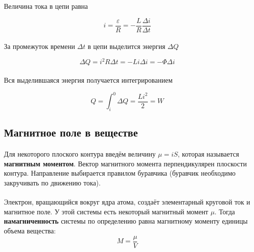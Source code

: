 \documentclass[dvipdfmx]{article}
\begin{document}
Величина тока в цепи равна

\begin{equation*}
  i = \frac{\varepsilon}{R} = -\frac{L}{R}\frac{\Delta i}{\Delta t}
\end{equation*}
\paragraph{}

За промежуток времени $\Delta t$ в цепи выделится энергия $\Delta Q$

\begin{equation*}
  \Delta Q = i^2R\Delta t = -Li\Delta i = -\Phi\Delta i
\end{equation*}
\paragraph{}

Вся выделившаяся энергия получается интегрированием

\begin{equation*}
  Q = \int_{i}^{0}\Delta Q = \frac{Li^2}{2} = W
\end{equation*}

\subsection{Магнитное поле в веществе}
\paragraph{}

Для некоторого плоского контура введём величину $\mu = iS$, которая называется \textbf{магнитным моментом}.
Вектор магнитного момента перпендикулярен плоскости контура. Направление выбирается правилом буравчика
(буравчик необходимо закручивать по движению тока).

\paragraph{}

Электрон, вращающийся вокруг ядра атома, создаёт элементарный круговой ток и магнитное поле. У этой системы есть
некоторый магнитный момент $\mu$. Тогда \textbf{намагниченность} системы по определению равна магнитному моменту
единицы объема вещества:
\begin{equation*}
  M = \frac{\mu}{V}
\end{equation*}
\end{document}
